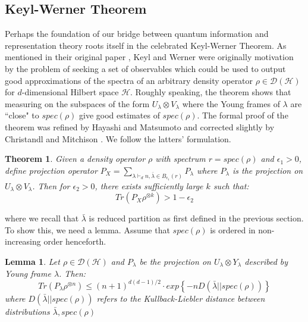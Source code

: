 \documentclass[11pt]{article}%
\newtheorem{thm}{Theorem}
\newtheorem{lemma}{Lemma}
\begin{document}
\subsection{Keyl-Werner Theorem}
Perhaps the foundation of our bridge between quantum information and representation theory roots itself in the celebrated Keyl-Werner Theorem. As mentioned in their original paper \cite{KW}, Keyl and Werner were originally motivation by the problem of seeking a set of observables which could be used to output good approximations of the spectra of an arbitrary density operator $\rho \in \mathcal{D}(\mathcal{H})$ for $d$-dimensional Hilbert space $\mathcal{H}$.  Roughly speaking, the theorem shows that measuring on the subspaces of the form $U_\lambda \otimes V_\lambda$ where the Young frames of $\lambda$ are ``close" to $spec(\rho)$ give good estimates of $spec(\rho)$. The formal proof of the theorem was refined by Hayashi and Matsumoto \cite{HM} and corrected slightly by Christandl and Mitchison \cite{CM}. We follow the latters' formulation.

\begin{thm} \label{keyl}
  Given a density operator $\rho$ with spectrum $r  = spec(\rho)$ and $\epsilon_1 > 0$, define projection operator $P_X = \sum_{\lambda \vdash_d n, \bar{\lambda} \in B_{\epsilon_1}(r)} P_{\lambda}$ where $P_{\lambda}$ is the projection on $U_{\lambda} \otimes V_{\lambda}$. Then for $\epsilon_2 > 0$, there exists sufficiently large $k$ such that:
  $$  Tr(P_X \rho^{\otimes k}) > 1 - \epsilon_2$$
\end{thm}

\noindent where we recall that $\bar{\lambda}$ is reduced partition as first defined in the previous section. To show this, we need a lemma.  Assume that $spec(\rho)$ is ordered in non-increasing order henceforth.

\begin{lemma}
  Let $\rho \in \mathcal{D}(\mathcal{H})$ and $P_{\lambda}$ be the projection on $U_{\lambda} \otimes Y_{\lambda}$ described by Young frame $\lambda$. Then:
  $$Tr(P_{\lambda}\rho^{\otimes n}) \leq (n+1)^{d(d-1)/2} \cdot exp \left\{-n D(\bar{\lambda}||spec(\rho)) \right\} $$
  where $D(\bar{\lambda}||spec(\rho))$ refers to the Kullback-Liebler distance between distributions $\bar{\lambda},spec(\rho)$
\end{lemma}
\end{document}
